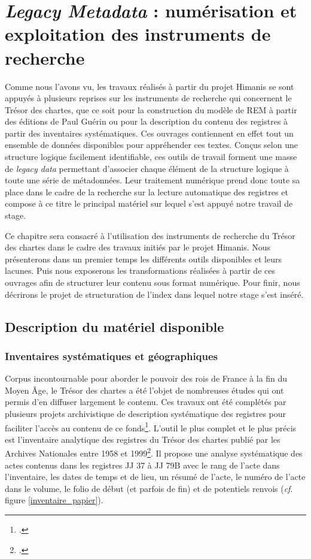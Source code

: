 \documentclass[a4paper,12pt,twoside]{book}
\begin{document}
	
	\chapter{\textit{Legacy Metadata} : numérisation et exploitation des instruments de recherche}
	
	Comme nous l'avons vu, les travaux réalisés à partir du projet Himanis se sont appuyés à plusieurs reprises sur les instruments de recherche qui concernent le Trésor des chartes, que ce soit pour la construction du modèle de REM à partir des éditions de Paul Guérin ou pour la description du contenu des registres à partir des inventaires systématiques. Ces ouvrages contiennent en effet tout un ensemble de données disponibles pour appréhender ces textes. Conçus selon une structure logique facilement identifiable, ces outils de travail forment une masse de \textit{legacy data} permettant d'associer chaque élément de la structure logique à toute une série de métadonnées. Leur traitement numérique prend donc toute sa place dans le cadre de la recherche sur la lecture automatique des registres et compose à ce titre le principal matériel sur lequel s'est appuyé notre travail de stage.
	
	Ce chapitre sera consacré à l'utilisation des instruments de recherche du Trésor des chartes dans le cadre des travaux initiés par le projet Himanis. Nous présenterons dans un premier temps les différents outils disponibles et leurs lacunes. Puis nous exposerons les transformations réalisées à partir de ces ouvrages afin de structurer leur contenu sous format numérique. Pour finir, nous décrirons le projet de structuration de l'index dans lequel notre stage s'est inséré.
	
	\section{Description du matériel disponible}
	
	\subsection{Inventaires systématiques et géographiques}
	
	Corpus incontournable pour aborder le pouvoir des rois de France à la fin du Moyen Âge, le Trésor des chartes a été l'objet de nombreuses études qui ont permis d'en diffuser largement le contenu. Ces travaux ont été complétés par plusieurs projets archivistique de description systématique des registres pour faciliter l'accès au contenu de ce fonds\footcite{stutzmann_recherche_2017}. L'outil le plus complet et le plus précis est l'inventaire analytique des registres du Trésor des chartes publié par les Archives Nationales entre 1958 et 1999\footcite{glenisson_registres_1958}. Il propose une analyse systématique des actes contenus dans les registres JJ 37 à JJ 79B avec le rang de l'acte dans l'inventaire, les dates de temps et de lieu, un résumé de l'acte, le numéro de l'acte dans le volume, le folio de début (et parfois de fin) et de potentiels renvois (\textit{cf}. figure \ref{inventaire_papier}).
	
\end{document}
